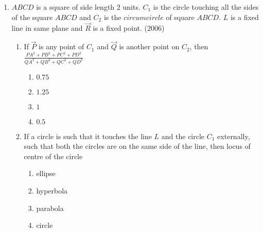 \begin{enumerate}[label=\thesubsection.\arabic*.,ref=\thesubsection.\theenumi]
\begin{multicols}{4}
\begin{enumerate}
                 \item $\brak{-\frac{3}{2}, 0}$
                 \item $\brak{-\frac{5}{2}, 2}$
                 \item $\brak{-\frac{3}{2}, \frac{5}{2}}$
                 \item $\brak{-4, 0}$
             \end{enumerate}
\end{multicols}
\item $ABCD$ is a square of side length $2$ units. $C_1$ is the circle touching all the sides of the square $ABCD$ and $C_2$ is the $circumcircle$ of square $ABCD$. $L$ is a fixed line in same plane and $\vec{R}$ is a fixed point.
\hfill(2006)
\begin{enumerate}
\item If $\vec{P}$ is any point of $C_1$ and $\vec{Q}$ is another point on $C_2$, then $\frac{PA^2+PB^2+PC^2+PD^2}{QA^2+QB^2+QC^2+QD^2}$
%
\begin{multicols}{4}
\begin{enumerate}
\item $0.75$
\item $1.25$
\item $1$
\item $0.5$
\end{enumerate}
\end{multicols}
\item If a circle is such that it touches the line $L$ and the circle $C_1$ externally, such that both the circles are on the same side of the line, then locus of centre of the circle 
%
\begin{multicols}{4}
\begin{enumerate}
\item ellipse
\item hyperbola
\item parabola
\item circle
\end{enumerate}
\end{multicols}


\end{enumerate}
\end{enumerate}
